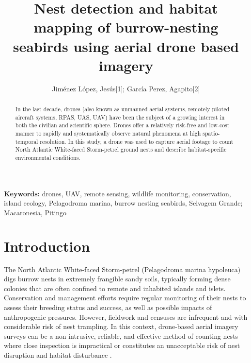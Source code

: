 \documentclass[12pt]{article}
\begin{document}
\title{Nest detection and habitat mapping of burrow-nesting seabirds using aerial drone based imagery}

\author{Jiménez López, Jesús[1]; García Perez, Agapito[2]}


\maketitle
\begin{abstract}
	

In the last decade, drones (also known as unmanned aerial systems, remotely piloted aircraft systems, RPAS, UAS, UAV) have been the subject of a growing interest in both the civilian and scientific sphere. Drones offer a relatively risk-free and low-cost manner to rapidly and systematically observe natural phenomena at high spatio-temporal resolution. In this study, a drone was used to capture aerial footage to count North Atlantic White-faced Storm-petrel ground nests and describe habitat-specific environmental conditions.

\end{abstract}

{\bf Keywords:} drones, UAV, remote sensing, wildlife monitoring, conservation, island ecology, Pelagodroma marina, burrow nesting seabirds, Selvagem Grande; Macaronesia, Pitingo

\section{Introduction}

The North Atlantic White-faced Storm-petrel (Pelagodroma marina hypoleuca) digs burrow nests in extremely frangible sandy soils, typically forming dense colonies that are often confined to remote and inhabited islands and islets. Conservation and management efforts require regular monitoring of their nests to assess their breeding status and success, as well as possible impacts of anthropogenic pressures. However, fieldwork and censuses are infrequent and with considerable risk of nest trampling. In this context, drone-based aerial imagery surveys can be a non-intrusive, reliable, and effective method of counting nests where close inspection is impractical or constitutes an unacceptable risk of nest disruption and habitat disturbance \cite{ventura_mapping_2018}. 
\end{document}
